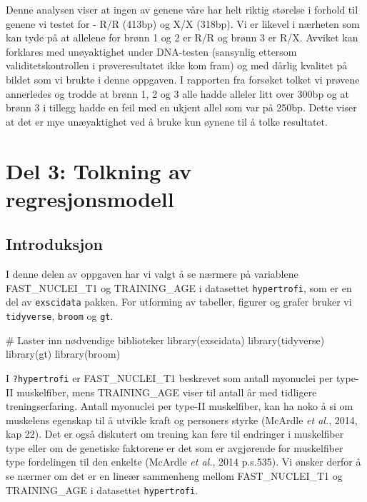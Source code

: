 \documentclass[
  letterpaper,
  DIV=11,
  numbers=noendperiod]{scrreprt}
\newenvironment{Shaded}{\begin{snugshade}}{\end{snugshade}}
\newcommand{\CommentTok}[1]{\textcolor[rgb]{0.37,0.37,0.37}{#1}}
\newcommand{\FunctionTok}[1]{\textcolor[rgb]{0.28,0.35,0.67}{#1}}
\newcommand{\NormalTok}[1]{\textcolor[rgb]{0.00,0.23,0.31}{#1}}
\begin{document}
Denne analysen viser at ingen av genene våre har helt riktig størelse i
forhold til genene vi testet for - R/R (413bp) og X/X (318bp). Vi er
likevel i nærheten som kan tyde på at allelene for brønn 1 og 2 er R/R
og brønn 3 er R/X. Avviket kan forklares med unøyaktighet under
DNA-testen (sansynlig ettersom validitetskontrollen i prøveresultatet
ikke kom fram) og med dårlig kvalitet på bildet som vi brukte i denne
oppgaven. I rapporten fra forsøket tolket vi prøvene annerledes og
trodde at brønn 1, 2 og 3 alle hadde alleler litt over 300bp og at brønn
3 i tillegg hadde en feil med en ukjent allel som var på 250bp. Dette
viser at det er mye unæyaktighet ved å bruke kun øynene til å tolke
resultatet.

\section{Del 3: Tolkning av
regresjonsmodell}\label{del-3-tolkning-av-regresjonsmodell}

\subsection{Introduksjon}\label{introduksjon-3}

I denne delen av oppgaven har vi valgt å se nærmere på variablene
FAST\_NUCLEI\_T1 og TRAINING\_AGE i datasettet \texttt{hypertrofi}, som
er en del av \texttt{exscidata} pakken. For utforming av tabeller,
figurer og grafer bruker vi \texttt{tidyverse}, \texttt{broom} og
\texttt{gt}.

\begin{Shaded}
\begin{Highlighting}[]
\CommentTok{\# Laster inn nødvendige biblioteker}
\FunctionTok{library}\NormalTok{(exscidata)}
\FunctionTok{library}\NormalTok{(tidyverse)}
\FunctionTok{library}\NormalTok{(gt)}
\FunctionTok{library}\NormalTok{(broom)}
\end{Highlighting}
\end{Shaded}

I \texttt{?hypertrofi} er FAST\_NUCLEI\_T1 beskrevet som antall
myonuclei per type-II muskelfiber, mens TRAINING\_AGE viser til antall
år med tidligere treningserfaring. Antall myonuclei per type-II
muskelfiber, kan ha noko å si om muskelens egenskap til å utvikle kraft
og personers styrke (McArdle \emph{et al.}, 2014, kap 22). Det er også
diskutert om trening kan føre til endringer i muskelfiber type eller om
de genetiske faktorene er det som er avgjørende for muskelfiber type
fordelingen til den enkelte (McArdle \emph{et al.}, 2014 p.s.535). Vi
ønsker derfor å se nærmer om det er en lineær sammenheng mellom
FAST\_NUCLEI\_T1 og TRAINING\_AGE i datasettet \texttt{hypertrofi}.
\end{document}
